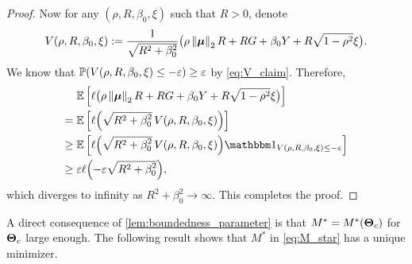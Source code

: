 \begin{proof}
    Now for any $(\rho, R, \beta_0, \xi)$ such that $R > 0$, denote
    \begin{equation*}
        V(\rho, R, \beta_0, \xi) := \frac{1}{\sqrt{R^2 + \beta_0^2}} \bigl( \rho \left\|{{\boldsymbol{\mu}}}\right\|_2 R + R G + \beta_0 Y + R\sqrt{1 - \rho^2} \xi \bigr). 
    \end{equation*}
    We know that $\mathbb{P} (V(\rho, R, \beta_0, \xi) \le - \varepsilon) \ge \varepsilon$ by \cref{eq:V_claim}. Therefore,
    \begin{align*}
        & \E \left[ \ell \bigl( \rho \norm{\vmu}_2 R + R G + \beta_0 Y + R\sqrt{1 - \rho^2} \xi \bigr) \right]
        \\ 
          = {} & \E \left[ \ell \Bigl( \sqrt{ R^2 + \smash{\beta_0^2} } \, V(\rho, R, \beta_0, \xi) \Bigr) \right] \\
        \ge {} & \E \left[ \ell \Bigl( \sqrt{ R^2 + \smash{\beta_0^2} } \, V(\rho, R, \beta_0, \xi) \Bigr) \ind_{V(\rho, R, \beta_0, \xi) \le - \veps} \right] \\
        \ge {} & \veps \ell \Bigl( - \veps \sqrt{ R^2 + \smash{\beta_0^2} } \Bigr),
    \end{align*}
    which diverges to infinity as $R^2 + \beta_0^2 \to \infty$. This completes the proof.
\end{proof}

A direct consequence of \cref{lem:boundedness_parameter} is that $M^* = M^*(\text{\boldmath $\Theta$}_{c})$ for $\text{\boldmath $\Theta$}_{c}$ large enough. The following result shows that $M^*$ in \cref{eq:M_star} has a unique minimizer.

